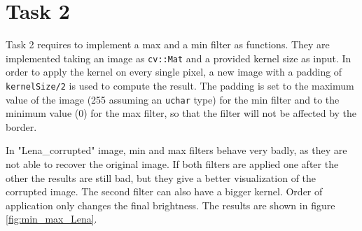 \documentclass{article}
\begin{document}
\section*{Task 2}
Task 2 requires to implement a max and a min filter as functions.
They are implemented taking an image as \texttt{cv::Mat} and a provided kernel size as input.
In order to apply the kernel on every single pixel, a new image with a padding of \texttt{kernelSize/2} is used to compute the result.
The padding is set to the maximum value of the image (255 assuming an \texttt{uchar} type) for the min filter and to the minimum value (0) for the max filter, so that the filter will not be affected by the border.

In "Lena\_corrupted" image, min and max filters behave very badly, as they are not able to recover the original image. If both filters are applied one after the other the results are still bad, but they give a better visualization of the corrupted image. The second filter can also have a bigger kernel. Order of application only changes the final brightness.
The results are shown in figure \ref{fig:min_max_Lena}.
\end{document}
